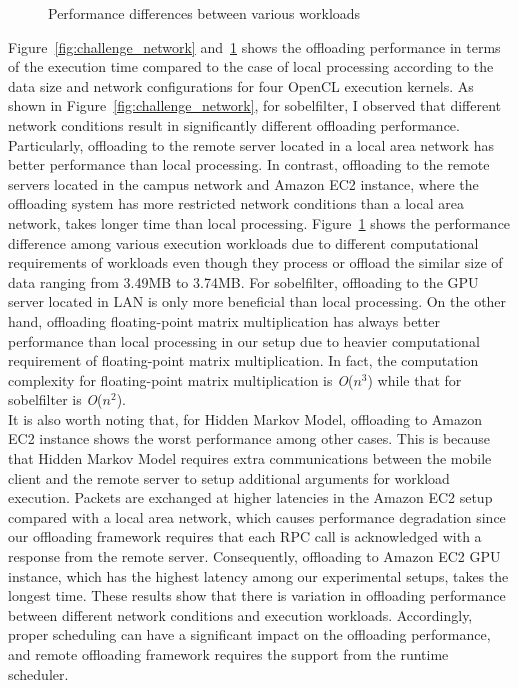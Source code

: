 %
\begin{figure}
\centering
{}
\caption{Performance differences between various workloads}
\label{fig:challenge_workload}
\end{figure}
%
Figure~\ref{fig:challenge_network} and~\ref{fig:challenge_workload}
shows the offloading performance in terms of the
execution time compared to the case of local processing according to
the data size and network configurations for four OpenCL execution
kernels.
%
As shown in Figure~\ref{fig:challenge_network}, for sobelfilter, I observed that different
network conditions result in significantly different offloading
performance.
%
Particularly, offloading to the remote server located in a local area
network has better performance than local processing.
%
In contrast, offloading to the remote servers located in the campus network
and Amazon EC2 instance, where the offloading system has more restricted network conditions
than a local area network, takes longer time than local processing. 
%
Figure~\ref{fig:challenge_workload} shows the performance difference among various execution
workloads due to different computational requirements of workloads 
even though they process or offload the similar size of data ranging 
from 3.49MB to 3.74MB.
%
For sobelfilter, offloading to the GPU server located in LAN is only
more beneficial than local processing.
%
On the other hand, offloading floating-point matrix multiplication has
always better performance than local processing in our setup due to
heavier computational requirement of floating-point matrix
multiplication.
%
In fact, the computation complexity for floating-point matrix
multiplication is {\it O}($n^{3}$) while that for sobelfilter is
{\it O}($n^{2}$).\\
%
It is also worth noting that, for Hidden Markov Model, offloading to 
Amazon EC2 instance shows the worst performance among other cases.
%
This is because that Hidden Markov Model requires extra communications
between the mobile client and the remote server to setup additional
arguments for workload execution.
%
Packets are exchanged at higher latencies in the Amazon EC2 setup
compared with a local area network, which causes performance degradation
since our offloading framework requires that each RPC call is acknowledged 
with a response from the remote server.
%
Consequently, offloading to Amazon EC2 GPU instance, which has the
highest latency among our experimental setups, takes the longest time.
%
These results show that there is variation in offloading performance
between different network conditions and execution workloads.
%
Accordingly, proper scheduling can have a significant impact on the
offloading performance, and remote offloading framework requires the
support from the runtime scheduler.
%
